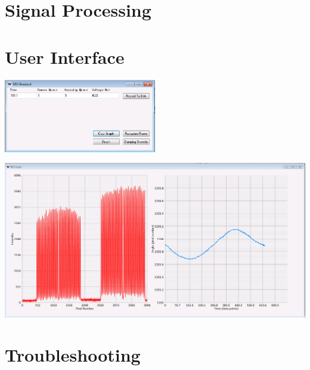 \documentclass{article}
\begin{document}
\section{Signal Processing}
\section{User Interface}

\begin{center}
\includegraphics[width=0.5\textwidth]{BRSReadoutScreen.png}\\
\end{center}
\includegraphics[width=\textwidth]{BRSReadoutScreenGraph.png}

\section{Troubleshooting}

{}
\end{document}
